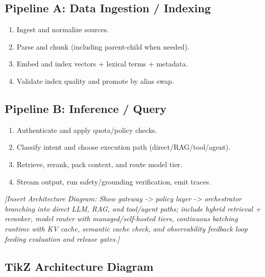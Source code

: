 \subsection*{Pipeline A: Data Ingestion / Indexing}
\begin{enumerate}
  \item Ingest and normalize sources.
  \item Parse and chunk (including parent-child when needed).
  \item Embed and index vectors + lexical terms + metadata.
  \item Validate index quality and promote by alias swap.
\end{enumerate}

\subsection*{Pipeline B: Inference / Query}
\begin{enumerate}
  \item Authenticate and apply quota/policy checks.
  \item Classify intent and choose execution path (direct/RAG/tool/agent).
  \item Retrieve, rerank, pack context, and route model tier.
  \item Stream output, run safety/grounding verification, emit traces.
\end{enumerate}

\textit{[Insert Architecture Diagram: Show gateway -> policy layer -> orchestrator branching into direct LLM, RAG, and tool/agent paths; include hybrid retrieval + reranker, model router with managed/self-hosted tiers, continuous batching runtime with KV cache, semantic cache check, and observability feedback loop feeding evaluation and release gates.]}

\subsection*{TikZ Architecture Diagram}
\begin{center}
\end{center}

